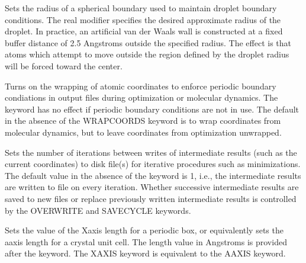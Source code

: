 \documentclass[letterpaper,11pt,english]{sphinxmanual}
\begin{document}
\ignorespaces {}\label{\detokenize{text/keywords:key-wall}}\begin{description}
\sphinxAtStartPar
Sets the radius of a spherical boundary used to maintain droplet boundary conditions. The real modifier specifies the desired approximate radius of the droplet. In practice, an artificial van der Waals wall is constructed at a fixed buffer distance of 2.5 Angstroms outside the specified radius. The effect is that atoms which attempt to move outside the region defined by the droplet radius will be forced toward the center.

\end{description}

\ignorespaces {}\label{\detokenize{text/keywords:wrap-coords}}\begin{description}
\sphinxAtStartPar
Turns on the wrapping of atomic coordinates to enforce periodic boundary condiations in output files during optimization or molecular dynamics. The keyword has no effect if periodic boundary conditions are not in use. The default in the absence of the WRAP\sphinxhyphen{}COORDS keyword is to wrap coordinates from molecular dynamics, but to leave coordinates from optimization unwrapped.

\end{description}

\ignorespaces {}\label{\detokenize{text/keywords:key-writeout}}\begin{description}
\sphinxAtStartPar
Sets the number of iterations between writes of intermediate results (such as the current coordinates) to disk file(s) for iterative procedures such as minimizations. The default value in the absence of the keyword is 1, i.e., the intermediate results are written to file on every iteration. Whether successive intermediate results are saved to new files or replace previously written intermediate results is controlled by the OVERWRITE and SAVE\sphinxhyphen{}CYCLE keywords.

\end{description}

\ignorespaces {}\label{\detokenize{text/keywords:key-x-axis}}\begin{description}
\sphinxAtStartPar
Sets the value of the X\sphinxhyphen{}axis length for a periodic box, or equivalently sets the a\sphinxhyphen{}axis length for a crystal unit cell. The length value in Angstroms is provided after the keyword. The X\sphinxhyphen{}AXIS keyword is equivalent to the A\sphinxhyphen{}AXIS keyword.

\end{description}
\end{document}
